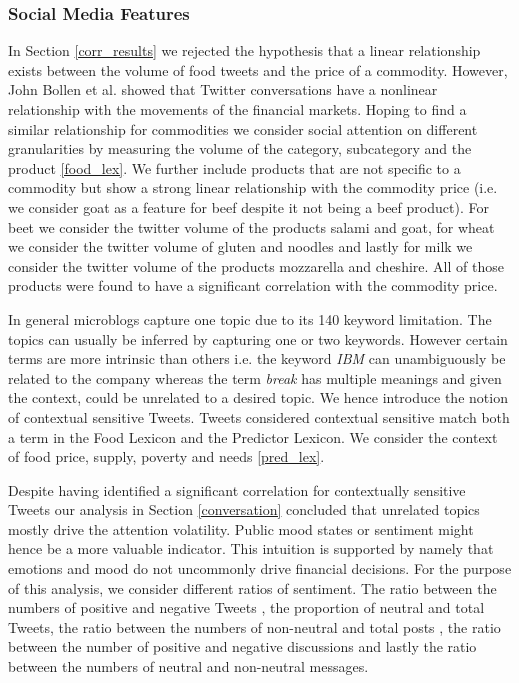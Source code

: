 \subsubsection{Social Media Features}
\label{SM1}



In Section \ref{corr_results} we rejected the hypothesis that a linear relationship exists between the volume of food tweets and the price of a commodity. However, John Bollen et al. \cite{john11} showed that Twitter conversations have a nonlinear relationship with the movements of the financial markets. Hoping to find a similar relationship for commodities  we consider social attention on different granularities by measuring the volume of the category, subcategory and the product \ref{food_lex}. We further include products that are not specific to a commodity but show a strong linear relationship with the commodity price (i.e. we consider goat as a feature for beef despite it not being a beef product). For beet we consider the twitter volume of the products salami and goat, for wheat we consider the twitter volume of gluten and noodles and lastly for milk we consider the twitter volume of the products mozzarella and cheshire. All of those products were found to have a significant correlation with the commodity price. 
 
 In general microblogs capture one topic due to its 140 keyword limitation. The topics can usually be inferred by capturing one or two keywords. However certain terms are more intrinsic than others i.e. the keyword \emph{IBM} can unambiguously be related to the company whereas the  term \emph{break} has multiple meanings and given the context, could be unrelated to a desired topic. We hence introduce the notion of contextual sensitive Tweets. Tweets considered contextual sensitive match both a term in the Food Lexicon and the Predictor Lexicon. We consider the context of food price, supply, poverty and needs \ref{pred_lex}. 
 
 Despite having identified a significant correlation for contextually sensitive Tweets our analysis in Section \ref{conversation} concluded that unrelated topics mostly drive the attention volatility. Public mood states or sentiment might hence be a more valuable indicator. This intuition is supported by \cite{nofsinger05} namely that emotions and mood do not uncommonly drive financial decisions. For the purpose of this analysis, we consider different ratios of sentiment. The ratio between the numbers of positive and negative Tweets \cite{Nguyen12}, the proportion of neutral and total Tweets,  the ratio between the numbers of non-neutral and total posts \cite{Zhang09}, the ratio between the number of positive and negative discussions and lastly the ratio between the numbers of neutral and non-neutral messages. 


